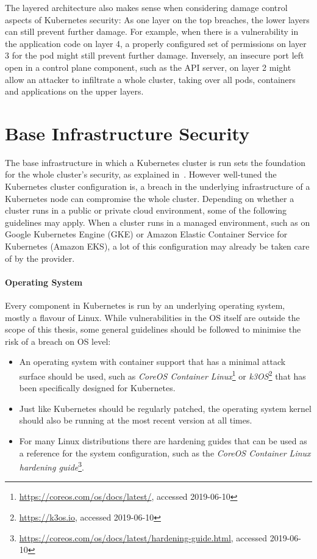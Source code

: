 The layered architecture also makes sense when considering damage control aspects of Kubernetes security: As one layer on the top breaches, the lower layers can still prevent further damage. For example, when there is a vulnerability in the application code on layer 4, a properly configured set of permissions on layer 3 for the pod might still prevent further damage. Inversely, an insecure port left open in a control plane component, such as the API server, on layer 2 might allow an attacker to infiltrate a whole cluster, taking over all pods, containers and applications on the upper layers. 
	
\section{Base Infrastructure Security} \label{sec:layer1}

The base infrastructure in which a Kubernetes cluster is run sets the foundation for the whole cluster's security, as explained in~\textcite{securingkubernetesBaseInfra}. However well-tuned the Kubernetes cluster configuration is, a breach in the underlying infrastructure of a Kubernetes node can compromise the whole cluster. Depending on whether a cluster runs in a public or private cloud environment, some of the following guidelines may apply. When a cluster runs in a managed environment, such as on Google Kubernetes Engine (GKE) or Amazon Elastic Container Service for Kubernetes (Amazon EKS), a lot of this configuration may already be taken care of by the provider.

\paragraph{Operating System}

Every component in Kubernetes is run by an underlying operating system, mostly a flavour of Linux. While vulnerabilities in the OS itself are outside the scope of this thesis, some general guidelines should be followed to minimise the risk of a breach on OS level:

\begin{itemize}
    \item An operating system with container support that has a minimal attack surface should be used, such as \textit{CoreOS Container Linux}\footnote{\url{https://coreos.com/os/docs/latest/}, accessed 2019-06-10} or \textit{k3OS}\footnote{\url{https://k3os.io}, accessed 2019-06-10} that has been specifically designed for Kubernetes.
    \item Just like Kubernetes should be regularly patched, the operating system kernel should also be running at the most recent version at all times.
    \item For many Linux distributions there are hardening guides that can be used as a reference for the system configuration, such as the \textit{CoreOS Container Linux hardening guide}\footnote{\url{https://coreos.com/os/docs/latest/hardening-guide.html}, accessed 2019-06-10}. 
\end{itemize}

